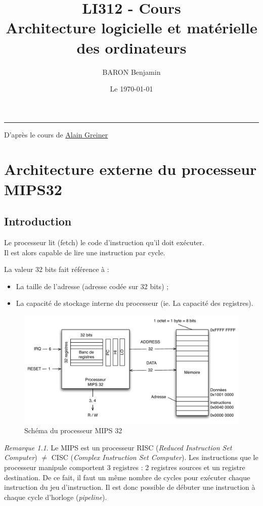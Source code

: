 \documentclass[11pt,english,french]{scrreprt}
\makeatletter
\theoremstyle{remark}
\newtheorem*{rem*}{Remarque}
\theoremstyle{definition}
\def\thickhrulefill{\leavevmode \leaders \hrule height 1pt\hfill \kern \z@}
\def\maketitle{%
  \null
  \thispagestyle{empty}%
  \vfill
  \begin{center}\leavevmode
    \normalfont
    {\huge \sffamily \bfseries\color{orange}\raggedright \@title\par}%
    \thickhrulefill\par
    {\large\sffamily\color{MyDarkBlue}\raggedleft \@author\par}%
    \vskip 1cm
    {\Large \sffamily \@date\par}%
	{\Large \sffamily \@blurb\par}%
  \end{center}%
  \vfill
  \null
  \cleardoublepage
  }
\def\blurb#1{\def\@blurb{#1}}
\makeatother
\begin{document}
\author{BARON Benjamin }
\date{Le \today}
\blurb{D'après le cours de \href{http://www-asim.lip6.fr/~alain/}{Alain Greiner}}

\title{LI312 - Cours\\
Architecture logicielle et matérielle des ordinateurs}

\maketitle
\renewcommand\contentsname{} 
\tableofcontents

\chapter{Architecture externe du processeur MIPS32} %

\section{Introduction} %

Le processeur lit (fetch) le code d'instruction qu'il doit exécuter.\\
Il est alors capable de lire une instruction par cycle.

La valeur 32 bits fait référence à :\begin{itemize}
	\item La taille de l'adresse (adresse codée sur 32 bits) ;
	\item La capacité de stockage interne du processeur (ie. La capacité des registres).
\end{itemize}

\begin{figure}[!h]
	\center
	\includegraphics[scale=.5]{diagrammes/MIPS32}
	\caption{Schéma du processeur MIPS 32}
\end{figure}

\begin{rem*}
	Le MIPS est un processeur RISC (\emph{Reduced Instruction Set Computer}) $\neq$ CISC (\emph{Complex Instruction Set Computer}). Les instructions que le processeur manipule comportent 3 registres : 2 registres sources et un registre destination. De ce fait, il faut un même nombre de cycles pour exécuter chaque instruction du jeu d'instruction. Il est donc possible de débuter une instruction à chaque cycle d'horloge (\emph{pipeline}).
\end{rem*}
\end{document}
